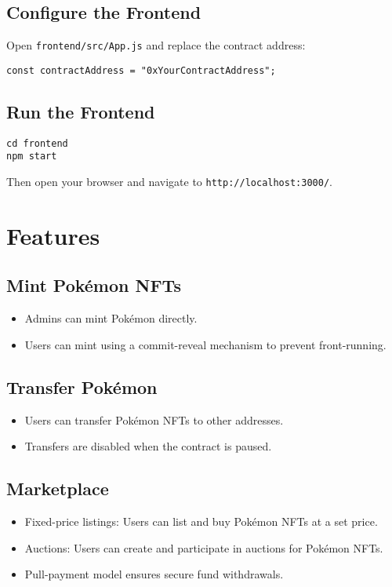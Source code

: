 \documentclass{article}
\begin{document}
\subsection{Configure the Frontend}
Open \texttt{frontend/src/App.js} and replace the contract address:

\begin{lstlisting}
const contractAddress = "0xYourContractAddress";
\end{lstlisting}

\subsection{Run the Frontend}
\begin{lstlisting}
cd frontend
npm start
\end{lstlisting}

Then open your browser and navigate to \texttt{http://localhost:3000/}.

\section{Features}
\subsection{Mint Pokémon NFTs}
\begin{itemize}
    \item Admins can mint Pokémon directly.
    \item Users can mint using a commit-reveal mechanism to prevent front-running.
\end{itemize}

\subsection{Transfer Pokémon}
\begin{itemize}
    \item Users can transfer Pokémon NFTs to other addresses.
    \item Transfers are disabled when the contract is paused.
\end{itemize}

\subsection{Marketplace}
\begin{itemize}
    \item Fixed-price listings: Users can list and buy Pokémon NFTs at a set price.
    \item Auctions: Users can create and participate in auctions for Pokémon NFTs.
    \item Pull-payment model ensures secure fund withdrawals.
\end{itemize}
\end{document}
